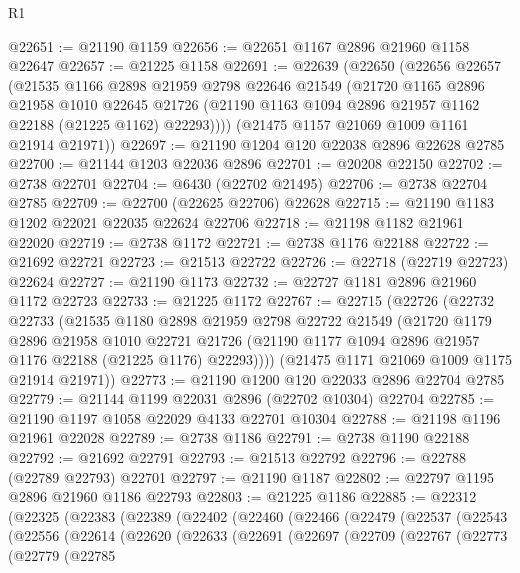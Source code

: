\begin{lexlean}{R1}
\begin{coremodule}
@22651 := @21190 @1159
@22656 := @22651 @1167 @2896 @21960 @1158 @22647
@22657 := @21225 @1158
@22691 := @22639
    (@22650
      (@22656
        @22657
        (@21535
          @1166
          @2898
          @21959
          @2798
          @22646
          @21549
          (@21720
            @1165
            @2896
            @21958
            @1010
            @22645
            @21726
            (@21190 @1163 @1094 @2896 @21957 @1162 @22188 (@21225 @1162) @22293))))
      (@21475 @1157 @21069 @1009 @1161 @21914 @21971))
@22697 := @21190 @1204 @120 @22038 @2896 @22628 @2785
@22700 := @21144 @1203 @22036 @2896
@22701 := @20208 @22150
@22702 := @2738 @22701
@22704 := @6430 (@22702 @21495)
@22706 := @2738 @22704 @2785
@22709 := @22700 (@22625 @22706) @22628
@22715 := @21190 @1183 @1202 @22021 @22035 @22624 @22706
@22718 := @21198 @1182 @21961 @22020
@22719 := @2738 @1172
@22721 := @2738 @1176 @22188
@22722 := @21692 @22721
@22723 := @21513 @22722
@22726 := @22718 (@22719 @22723) @22624
@22727 := @21190 @1173
@22732 := @22727 @1181 @2896 @21960 @1172 @22723
@22733 := @21225 @1172
@22767 := @22715
    (@22726
      (@22732
        @22733
        (@21535
          @1180
          @2898
          @21959
          @2798
          @22722
          @21549
          (@21720
            @1179
            @2896
            @21958
            @1010
            @22721
            @21726
            (@21190 @1177 @1094 @2896 @21957 @1176 @22188 (@21225 @1176) @22293))))
      (@21475 @1171 @21069 @1009 @1175 @21914 @21971))
@22773 := @21190 @1200 @120 @22033 @2896 @22704 @2785
@22779 := @21144 @1199 @22031 @2896 (@22702 @10304) @22704
@22785 := @21190 @1197 @1058 @22029 @4133 @22701 @10304
@22788 := @21198 @1196 @21961 @22028
@22789 := @2738 @1186
@22791 := @2738 @1190 @22188
@22792 := @21692 @22791
@22793 := @21513 @22792
@22796 := @22788 (@22789 @22793) @22701
@22797 := @21190 @1187
@22802 := @22797 @1195 @2896 @21960 @1186 @22793
@22803 := @21225 @1186
@22885 := @22312
    (@22325
      (@22383
        (@22389
          (@22402
            (@22460
              (@22466
                (@22479
                  (@22537
                    (@22543
                      (@22556
                        (@22614
                          (@22620
                            (@22633
                              (@22691
                                (@22697
                                  (@22709
                                    (@22767
                                      (@22773
                                        (@22779
                                          (@22785

\end{coremodule}
\end{lexlean}
